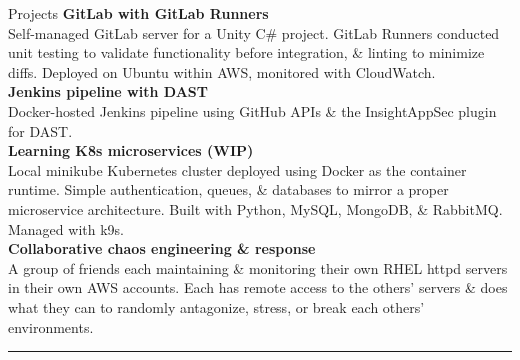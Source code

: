 \documentclass{resume} %
\begin{document}
{\begin{rSection}{Projects}
		{\bf GitLab with GitLab Runners}\\
		Self-managed GitLab server for a Unity C\# project. GitLab Runners conducted unit testing to validate functionality before integration, \& linting to minimize diffs. Deployed on Ubuntu within AWS, monitored with CloudWatch.\\
		
		{\bf Jenkins pipeline with DAST}\\
		Docker-hosted Jenkins pipeline using GitHub APIs \& the InsightAppSec plugin for DAST.\\
		
		
		{\bf Learning K8s microservices (WIP)}\\
		Local minikube Kubernetes cluster deployed using Docker as the container runtime. Simple authentication, queues, \& databases to mirror a proper microservice architecture. Built with Python, MySQL, MongoDB, \& RabbitMQ. Managed with k9s.\\
				
		{\bf Collaborative chaos engineering \& response}\\
		A group of friends each maintaining \& monitoring their own RHEL httpd servers in their own AWS accounts. Each has remote access to the others' servers \& does what they can to randomly antagonize, stress, or break each others' environments.\\
		
		\vfill\rule{\textwidth}{0.5pt}
	\end{rSection}
	
	}
\end{document}
